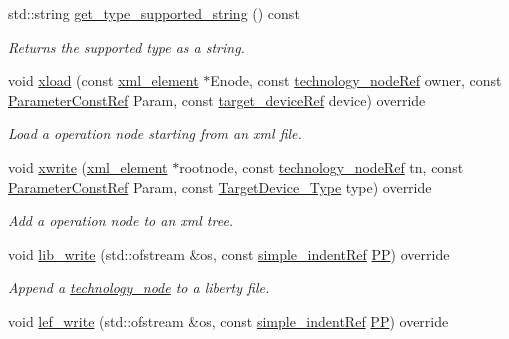 \begin{DoxyCompactItemize}
std\+::string \hyperlink{structoperation_a4ee8a603c8de43b79716ab1111b53a52}{get\+\_\+type\+\_\+supported\+\_\+string} () const
\begin{DoxyCompactList}\small\item\em Returns the supported type as a string. \end{DoxyCompactList}\item 
void \hyperlink{structoperation_a7a8e56978864cac9d8f6c4f9391aa05a}{xload} (const \hyperlink{classxml__element}{xml\+\_\+element} $\ast$Enode, const \hyperlink{technology__node_8hpp_a33dd193b7bd6b987bf0d8a770a819fa7}{technology\+\_\+node\+Ref} owner, const \hyperlink{Parameter_8hpp_a37841774a6fcb479b597fdf8955eb4ea}{Parameter\+Const\+Ref} Param, const \hyperlink{target__device_8hpp_acedb2b7a617e27e6354a8049fee44eda}{target\+\_\+device\+Ref} device) override
\begin{DoxyCompactList}\small\item\em Load a operation node starting from an xml file. \end{DoxyCompactList}\item 
void \hyperlink{structoperation_a5edb965df8d7b05e912feabfbfe1306b}{xwrite} (\hyperlink{classxml__element}{xml\+\_\+element} $\ast$rootnode, const \hyperlink{technology__node_8hpp_a33dd193b7bd6b987bf0d8a770a819fa7}{technology\+\_\+node\+Ref} tn, const \hyperlink{Parameter_8hpp_a37841774a6fcb479b597fdf8955eb4ea}{Parameter\+Const\+Ref} Param, const \hyperlink{target__device_8hpp_a476becc690220f0805ce73006449c732}{Target\+Device\+\_\+\+Type} type) override
\begin{DoxyCompactList}\small\item\em Add a operation node to an xml tree. \end{DoxyCompactList}\item 
void \hyperlink{structoperation_a862e63d21faf48219bfcf1650471da2a}{lib\+\_\+write} (std\+::ofstream \&os, const \hyperlink{simple__indent_8hpp_ad85cff64e49d5dbf5cefe96f411c720e}{simple\+\_\+indent\+Ref} \hyperlink{structtechnology__node_ae6edfff0ccd2700b5de9fb538536977a}{PP}) override
\begin{DoxyCompactList}\small\item\em Append a \hyperlink{structtechnology__node}{technology\+\_\+node} to a liberty file. \end{DoxyCompactList}\item 
void \hyperlink{structoperation_aa6451ee75f5e5db619448ae294fc85d3}{lef\+\_\+write} (std\+::ofstream \&os, const \hyperlink{simple__indent_8hpp_ad85cff64e49d5dbf5cefe96f411c720e}{simple\+\_\+indent\+Ref} \hyperlink{structtechnology__node_ae6edfff0ccd2700b5de9fb538536977a}{PP}) override

\end{DoxyCompactItemize}
